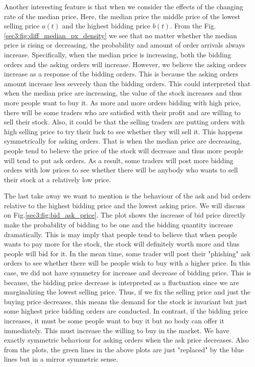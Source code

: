 \documentclass[letterpaper,12pt]{article}
\numberwithin{equation}{section}
\begin{document}
Another interesting feature is that when we consider the effects of the changing rate of the median price. Here, the median price the middle price of the lowest selling price $a(t)$ and the highest bidding price $b(t)$. From the Fig. \ref{sec3:fig:diff_median_px_density} we see that no matter whether the median price is rising or decreasing, the probability and amount of order arrivals always increase. Specifically, when the median price is increasing, both the bidding orders and the asking orders will increase. However, we believe the asking orders increase as a response of the bidding orders. This is because the asking orders amount increase less severely than the bidding orders. This could interpreted that when the median price are increasing, the value of the stock increases and thus more people want to buy it. As more and more orders bidding with high price, there will be some traders who are satisfied with their profit and are willing to sell their stock. Also, it could be that the selling traders are putting orders with high selling price to try their luck to see whether they will sell it. This happens symmetrically for asking orders. That is when the median price are decreasing, people tend to believe the price of the stock will decrease and thus more people will tend to put ask orders. As a result, some traders will post more bidding orders with low prices to see whether there will be anybody who wants to sell their stock at a relatively low price. 



The last take away we want to mention is the behaviour of the ask and bid orders relative to the highest bidding price and the lowest asking price. We will discuss on Fig.\ref{sec3:fig:bid_ask_price}. The plot shows the increase of bid price directly make the probability of bidding to be one and the bidding quantity increase dramatically. This is may imply that people tend to believe that when people wants to pay more for the stock, the stock will definitely worth more and thus people will bid for it. In the mean time, some trader will post their "phishing" ask orders to see whether there will be people wish to buy with a higher price. In this case, we did not have symmetry for increase and decrease of bidding price. This is because, the bidding price decrease is interpreted as a fluctuation since we are marginalizing the lowest selling price. Thus, if we fix the selling price and just the buying price decreases, this means the demand for the stock is invariant but just some highest price bidding orders are conducted.  In contrast, if the bidding price increases, it must be some people want to buy it but no body can offer it immediately. This must increase the willing to buy in the market. We have exactly symmetric behaviour for asking orders when the ask price decreases. Also from the plots, the green lines in the above plots are just "replaced" by the blue lines but in a mirror symmetric sense. 
\end{document}
